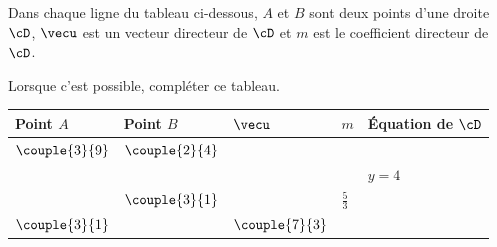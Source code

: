 Dans chaque ligne du tableau ci-dessous, $A$ et $B$ sont deux points d'une droite $\cD$, $\vecu$ est un vecteur directeur de $\cD$ et $m$ est le coefficient directeur de $\cD$.

Lorsque c'est possible, compléter ce tableau.
\begin{center}
\setlength{\tabcolsep}{0.1cm}
\renewcommand{\arraystretch}{1.5}
\begin{tabular}{
*{4}{|>{\centering\arraybackslash}m{1.8cm}}
|>{\centering\arraybackslash}m{3.2cm}|}
\hline 
Point $A$ & Point $B$ & $\vecu$ & $m$ & Équation de $\cD$ \\
\hline
$\couple{3}{9}$ & $\couple{2}{4}$ & & & \\
\hline 
 &  & & & $y=4$ \\
\hline 
 & $\couple{3}{1}$ & & $\frac{5}{3}$ & \\
\hline 
$\couple{3}{1}$ & & $\couple{7}{3}$ & & \\
\hline 
\end{tabular} 
\end{center}

